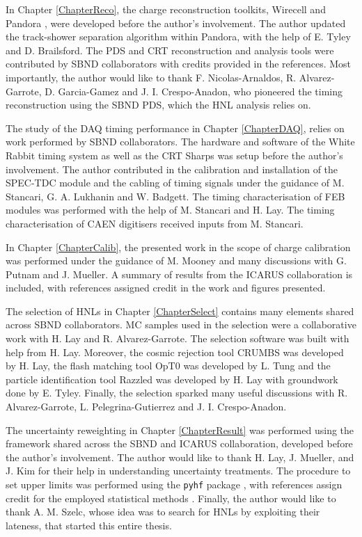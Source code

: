\begin{declaration}
In Chapter \ref{ChapterReco}, the charge reconstruction toolkits, Wirecell \cite{wirecell} and Pandora \cite{pandora}, were developed before the author's involvement.
The author updated the track-shower separation algorithm within Pandora, with the help of E. Tyley and D. Brailsford.
The PDS and CRT reconstruction and analysis tools were contributed by SBND collaborators with credits provided in the references.
Most importantly, the author would like to thank F. Nicolas-Arnaldos, R. Alvarez-Garrote, D. Garcia-Gamez and J. I. Crespo-Anadon, who pioneered the timing reconstruction using the SBND PDS, which the HNL analysis relies on.

The study of the DAQ timing performance in Chapter \ref{ChapterDAQ}, relies on work performed by SBND collaborators.
The hardware and software of the White Rabbit timing system as well as the CRT Sharps was setup before the author's involvement.
The author contributed in the calibration and installation of the SPEC-TDC module and the cabling of timing signals under the guidance of M. Stancari, G. A. Lukhanin and W. Badgett.
The timing characterisation of FEB modules was performed with the help of M. Stancari and H. Lay.
The timing characterisation of CAEN digitisers received inputs from M. Stancari.  

In Chapter \ref{ChapterCalib}, the presented work in the scope of charge calibration was performed under the guidance of M. Mooney and many discussions with G. Putnam and J. Mueller.
A summary of results from the ICARUS collaboration is included, with references assigned credit in the work and figures presented.

The selection of HNLs in Chapter \ref{ChapterSelect} contains many elements shared across SBND collaborators.
MC samples used in the selection were a collaborative work with H. Lay and R. Alvarez-Garrote.
The selection software was built with help from H. Lay. 
Moreover, the cosmic rejection tool CRUMBS was developed by H. Lay, the flash matching tool OpT0 was developed by L. Tung and the particle identification tool Razzled was developed by H. Lay with groundwork done by E. Tyley.
Finally, the selection sparked many useful discussions with R. Alvarez-Garrote, L. Pelegrina-Gutierrez and J. I. Crespo-Anadon.

The uncertainty reweighting in Chapter \ref{ChapterResult} was performed using the framework shared across the SBND and ICARUS collaboration, developed before the author's involvement.
The author would like to thank H. Lay, J. Mueller, and J. Kim for their help in understanding uncertainty treatments.
The procedure to set upper limits was performed using the \texttt{pyhf} package \cite{pyhf}, with references assign credit for the employed statistical methods \cite{asymptotic_test, CLs_Junk, CLs_Read}.
Finally, the author would like to thank A. M. Szelc, whose idea was to search for HNLs by exploiting their lateness, that started this entire thesis.  


\end{declaration}
